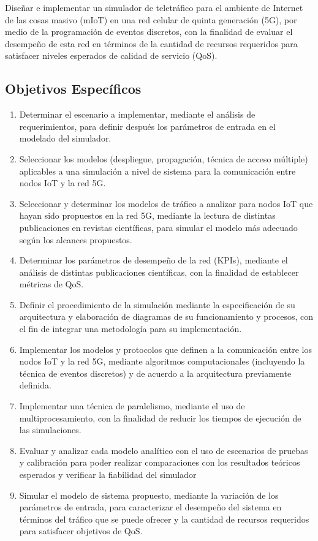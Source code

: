 Diseñar e implementar un simulador de teletráfico para el ambiente de Internet de las cosas masivo (mIoT) en una red celular de quinta generación (5G), por medio de la programación de eventos discretos, con la finalidad de evaluar el desempeño de esta red en términos de la cantidad de recursos requeridos para satisfacer niveles esperados de calidad de servicio (QoS).\newline

\subsection{Objetivos Específicos}

\begin{enumerate}
    \item Determinar el escenario a implementar, mediante el análisis de requerimientos, para definir después los parámetros de entrada en el modelado del simulador.
    \item Seleccionar los modelos (despliegue, propagación, técnica de acceso múltiple) aplicables a una simulación a nivel de sistema para la comunicación entre nodos IoT y la red 5G.
    \item Seleccionar y determinar los modelos de tráfico a analizar para nodos IoT que hayan sido propuestos en la red 5G, mediante la lectura de distintas publicaciones en revistas científicas, para simular el modelo más adecuado según los alcances propuestos.
    \item Determinar los parámetros de desempeño de la red (KPIs), mediante el análisis de distintas publicaciones científicas, con la finalidad de establecer métricas de QoS.
    \item Definir el procedimiento de la simulación mediante la especificación de su arquitectura y elaboración de diagramas de su funcionamiento y procesos, con el fin de integrar una metodología para su implementación.
    \item Implementar los modelos y protocolos que definen a la comunicación entre los nodos IoT y la red 5G, mediante algoritmos computacionales (incluyendo la técnica de eventos discretos) y de acuerdo a la arquitectura previamente definida.
    \item Implementar una técnica de paralelismo, mediante el uso de multiprocesamiento, con la finalidad de reducir los tiempos de ejecución de las simulaciones.
    \item Evaluar y analizar cada modelo analítico con el uso de escenarios de pruebas y calibración para poder realizar comparaciones con los resultados teóricos esperados y verificar la fiabilidad del simulador 
    \item Simular el modelo de sistema propuesto, mediante la variación de los parámetros de entrada, para caracterizar el desempeño del sistema en términos del tráfico que se puede ofrecer y la cantidad de recursos requeridos para satisfacer objetivos de QoS.
\end{enumerate}

